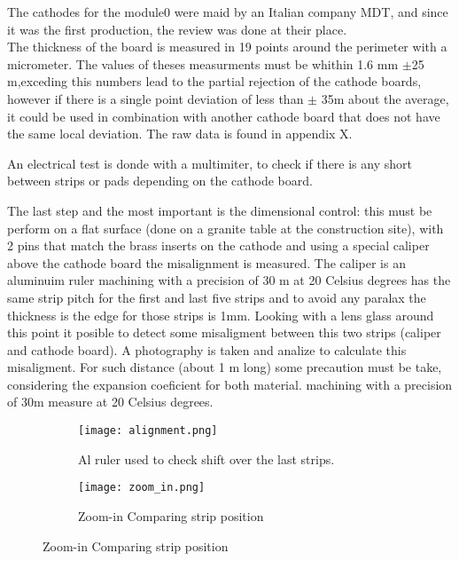 The cathodes for the module0 were maid by an Italian company MDT, and since it was the first production, the review was done at their place.\\ The
thickness of the board is measured in 19 points around the perimeter with a micrometer. The values of theses measurments must be whithin 1.6 mm $\pm$25\micro
m,exceding this numbers lead to the partial rejection of the cathode boards, however if there is a single point deviation of less than $\pm$ 35\micro m about
the average, it could be used in combination with another cathode board that does not have the same local deviation. The raw data is found in appendix X.\par An
electrical test is donde with a multimiter, to check if there is any short between strips or pads depending on the cathode board.\par The last step and the most
important is the dimensional control: this must be perform on a flat surface (done on a granite table at the construction site), with 2 pins that match the
brass inserts on the cathode and using a special caliper above the cathode board the misalignment is measured. The caliper is an aluminuim ruler machining  with a precision of 30 \micro m
at 20 Celsius degrees  has the same strip pitch for the first and last five strips and to avoid any paralax the thickness is the edge for those strips is 1mm. Looking
with a lens glass around this point it posible to detect some misaligment between this two strips (caliper and cathode board). A photography is taken and
analize to calculate this misaligment. For such distance (about 1 m long) some precaution must be take, considering the expansion coeficient for both material.
machining with a precision of 30\micro m measure at 20 Celsius degrees.\par

\begin{figure}[ht]
	\centering
	\hfill
	\begin{subfigure}[b]{0.35\textwidth}
		\centering
		\texttt{[image: alignment.png]}
		\caption{Al ruler used to check shift over the last strips.}
		\label{fig:ruler}
	\end{subfigure}
	\hfill
	\begin{subfigure}[b]{0.35\textwidth}
		\centering
		\texttt{[image: zoom\_in.png]}
		\caption{Zoom-in Comparing strip position}
		\label{fig:zoom}
	\end{subfigure}
	\hfill
\end{figure}

